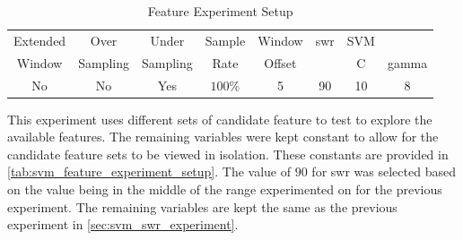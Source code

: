 \begin{table}[h]
\begin{center}

    \begin{tabular}{|c|c|c|c|c|c|cc|}
        \hline
        Extended & Over & Under & Sample & Window & \gls{swr} & SVM & \\
        Window & Sampling & Sampling & Rate & Offset &  & C & gamma \\ \hline
        No & No & Yes & $100\%$ & 5 & 90 & 10 & 8 \\ \hline
    \end{tabular}
    \caption{Feature Experiment Setup}
    \label{tab:svm_feature_experiment_setup}
\end{center}

\end{table}



This experiment uses different sets of candidate feature to test to explore the available features. The remaining variables were kept constant to allow for the candidate feature sets to be viewed in isolation. These constants are provided in \autoref{tab:svm_feature_experiment_setup}. The value of $90$ for \gls{swr} was selected based on the value being in the middle of the range experimented on for the previous experiment. The remaining variables are kept the same as the previous experiment in \autoref{sec:svm_swr_experiment}. 

